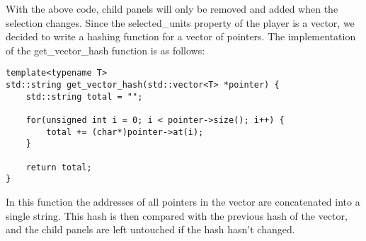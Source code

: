 With the above code, child panels will only be removed and added when the selection changes. Since the selected\_units property of the player is a vector, we decided to write a hashing function for a vector of pointers. The implementation of the get\_vector\_hash function is as follows:

\begin{lstlisting}[caption={Vector hash}]
template<typename T>
std::string get_vector_hash(std::vector<T> *pointer) {
    std::string total = "";

    for(unsigned int i = 0; i < pointer->size(); i++) {
        total += (char*)pointer->at(i);
    }

    return total;
}
\end{lstlisting}

In this function the addresses of all pointers in the vector are concatenated into a single string. This hash is then compared with the previous hash of the vector, and the child panels are left untouched if the hash hasn't changed.